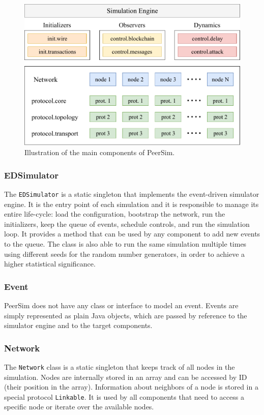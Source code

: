 \begin{figure}[ht]
	\centering
	\vspace*{0.25cm}
	\includegraphics[scale=0.9]{figures/peersim}
	\vspace*{0.2cm}
	\caption[Illustration of the main components of PeerSim]{Illustration of the main components of PeerSim.}
	\label{fig:peersim}
\end{figure}

\subsubsection{EDSimulator}
The \texttt{EDSimulator} is a static singleton that implements the event-driven simulator engine.
It is the entry point of each simulation and it is responsible to manage its entire life-cycle:
load the configuration, bootstrap the network, run the initializers, keep the queue of events, schedule controls, and run the simulation loop.
It provides a method that can be used by any component to add new events to the queue.
The class is also able to run the same simulation multiple times using different seeds for the random number generators, in order to achieve a higher statistical significance.

\subsubsection{Event}
PeerSim does not have any class or interface to model an event.
Events are simply represented as plain Java objects, which are passed by reference to the simulator engine and to the target components.

\subsubsection{Network}
The \texttt{Network} class is a static singleton that keeps track of all nodes in the simulation.
Nodes are internally stored in an array and can be accessed by ID (their position in the array).
Information about neighbors of a node is stored in a special protocol \texttt{Linkable}.
It is used by all components that need to access a specific node or iterate over the available nodes.

